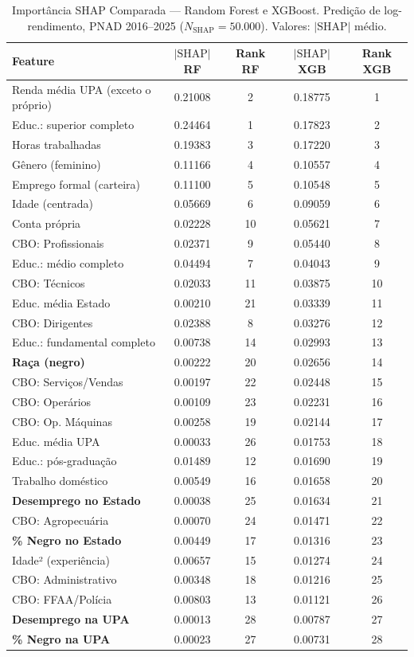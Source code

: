 \documentclass[12pt, a4paper, oneside]{article}
\begin{document}
\begin{table}[H]
\centering
\caption{Importância SHAP Comparada --- Random Forest e XGBoost. Predição de log-rendimento, PNAD 2016--2025 ($N_{\text{SHAP}}=50.000$). Valores: $|\text{SHAP}|$ médio.}
\label{tab:shap_importance}
\begin{tabular}{lcccc}
\toprule
\textbf{Feature} & \textbf{$|\text{SHAP}|$ RF} & \textbf{Rank RF} & \textbf{$|\text{SHAP}|$ XGB} & \textbf{Rank XGB} \\
\midrule
Renda média UPA (exceto o próprio) & 0.21008 & 2 & 0.18775 & 1 \\
Educ.: superior completo & 0.24464 & 1 & 0.17823 & 2 \\
Horas trabalhadas & 0.19383 & 3 & 0.17220 & 3 \\
Gênero (feminino) & 0.11166 & 4 & 0.10557 & 4 \\
Emprego formal (carteira) & 0.11100 & 5 & 0.10548 & 5 \\
Idade (centrada) & 0.05669 & 6 & 0.09059 & 6 \\
Conta própria & 0.02228 & 10 & 0.05621 & 7 \\
CBO: Profissionais & 0.02371 & 9 & 0.05440 & 8 \\
Educ.: médio completo & 0.04494 & 7 & 0.04043 & 9 \\
CBO: Técnicos & 0.02033 & 11 & 0.03875 & 10 \\
Educ. média Estado & 0.00210 & 21 & 0.03339 & 11 \\
CBO: Dirigentes & 0.02388 & 8 & 0.03276 & 12 \\
Educ.: fundamental completo & 0.00738 & 14 & 0.02993 & 13 \\
\textbf{Raça (negro)} & 0.00222 & 20 & 0.02656 & 14 \\
CBO: Serviços/Vendas & 0.00197 & 22 & 0.02448 & 15 \\
CBO: Operários & 0.00109 & 23 & 0.02231 & 16 \\
CBO: Op. Máquinas & 0.00258 & 19 & 0.02144 & 17 \\
Educ. média UPA & 0.00033 & 26 & 0.01753 & 18 \\
Educ.: pós-graduação & 0.01489 & 12 & 0.01690 & 19 \\
Trabalho doméstico & 0.00549 & 16 & 0.01658 & 20 \\
\textbf{Desemprego no Estado} & 0.00038 & 25 & 0.01634 & 21 \\
CBO: Agropecuária & 0.00070 & 24 & 0.01471 & 22 \\
\textbf{\% Negro no Estado} & 0.00449 & 17 & 0.01316 & 23 \\
Idade² (experiência) & 0.00657 & 15 & 0.01274 & 24 \\
CBO: Administrativo & 0.00348 & 18 & 0.01216 & 25 \\
CBO: FFAA/Polícia & 0.00803 & 13 & 0.01121 & 26 \\
\textbf{Desemprego na UPA} & 0.00013 & 28 & 0.00787 & 27 \\
\textbf{\% Negro na UPA} & 0.00023 & 27 & 0.00731 & 28 \\
\bottomrule
\end{tabular}
\end{table}
\end{document}
